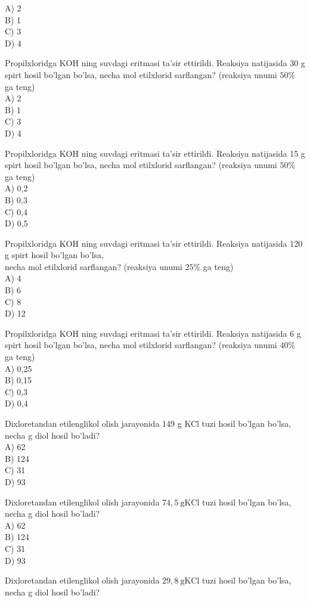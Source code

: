 A) 2\\
B) 1\\
C) 3\\
D) 4
  \item Propilxloridga KOH ning suvdagi eritmasi ta'sir ettirildi. Reaksiya natijasida 30 g spirt hosil bo'lgan bo'lsa, necha mol etilxlorid sarflangan? (reaksiya unumi $50 \%$ ga teng)\\
A) 2\\
B) 1\\
C) 3\\
D) 4
  \item Propilxloridga KOH ning suvdagi eritmasi ta'sir ettirildi. Reaksiya natijasida 15 g spirt hosil bo'lgan bo'lsa, necha mol etilxlorid sarflangan? (reaksiya unumi $50 \%$ ga teng)\\
A) 0,2\\
B) 0,3\\
C) 0,4\\
D) 0,5
  \item Propilxloridga KOH ning suvdagi eritmasi ta'sir ettirildi. Reaksiya natijasida 120 g spirt hosil bo'lgan bo'lsa,\\
necha mol etilxlorid sarflangan? (reaksiya unumi $25 \%$ ga teng)\\
A) 4\\
B) 6\\
C) 8\\
D) 12
  \item Propilxloridga KOH ning suvdagi eritmasi ta'sir ettirildi. Reaksiya natijasida 6 g spirt hosil bo'lgan bo'lsa, necha mol etilxlorid sarflangan? (reaksiya unumi $40 \%$ ga teng)\\
A) 0,25\\
B) 0,15\\
C) 0,3\\
D) 0,4
  \item Dixloretandan etilenglikol olish jarayonida 149 g KCl tuzi hosil bo'lgan bo'lsa, necha g diol hosil bo'ladi?\\
A) 62\\
B) 124\\
C) 31\\
D) 93
  \item Dixloretandan etilenglikol olish jarayonida $74,5 \mathrm{~g} \mathrm{KCl}$ tuzi hosil bo'lgan bo'lsa, necha g diol hosil bo'ladi?\\
A) 62\\
B) 124\\
C) 31\\
D) 93
  \item Dixloretandan etilenglikol olish jarayonida $29,8 \mathrm{~g} \mathrm{KCl}$ tuzi hosil bo'lgan bo'lsa, necha g diol hosil bo'ladi?\\
